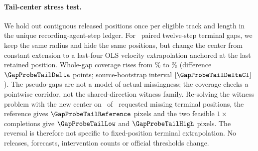 \paragraph{Tail-center stress test.}
We hold out contiguous released positions once per eligible track and
length in the unique recording-agent-step ledger. For \GapProbeTailGaps\ paired
twelve-step terminal gaps, we keep the same radius and hide the same
positions, but change the center from constant extension to a last-four
OLS velocity extrapolation anchored at the last retained position.
Whole-gap coverage rises from \GapProbeTailConstant\% to \GapProbeTailOLS\% (difference
$\GapProbeTailDelta$ points; source-bootstrap interval $[\GapProbeTailDeltaCI]$).
The pseudo-gaps are not a model of actual missingness; the coverage
checks a pointwise corridor, not the shared-direction witness family.
Re-solving the witness problem with the new center on \GapProbeTailMoved\ of
\GapProbeTailSteps\ requested missing terminal positions, the reference
gives $\GapProbeTailReference$ pixels and the two feasible $1\times$ completions
give $\GapProbeTailLow$ and $\GapProbeTailHigh$ pixels. The reversal is therefore not
specific to fixed-position terminal extrapolation. No releases,
forecasts, intervention counts or official thresholds change.
